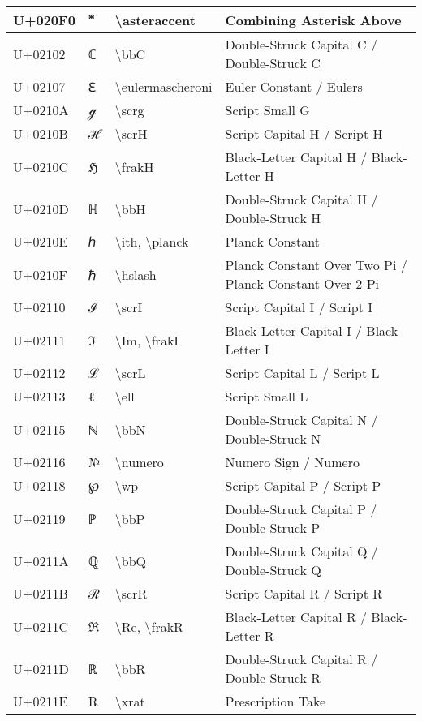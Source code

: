 \begin{table}[h]
\begin{tabulary}{\linewidth}{|L|L|L|L|}
\hline
U+020F0 &  ⃰  & {\textbackslash}asteraccent & Combining Asterisk Above \\
\hline
U+02102 & ℂ & {\textbackslash}bbC & Double-Struck Capital C / Double-Struck C \\
\hline
U+02107 & ℇ & {\textbackslash}eulermascheroni & Euler Constant / Eulers \\
\hline
U+0210A & ℊ & {\textbackslash}scrg & Script Small G \\
\hline
U+0210B & ℋ & {\textbackslash}scrH & Script Capital H / Script H \\
\hline
U+0210C & ℌ & {\textbackslash}frakH & Black-Letter Capital H / Black-Letter H \\
\hline
U+0210D & ℍ & {\textbackslash}bbH & Double-Struck Capital H / Double-Struck H \\
\hline
U+0210E & ℎ & {\textbackslash}ith, {\textbackslash}planck & Planck Constant \\
\hline
U+0210F & ℏ & {\textbackslash}hslash & Planck Constant Over Two Pi / Planck Constant Over 2 Pi \\
\hline
U+02110 & ℐ & {\textbackslash}scrI & Script Capital I / Script I \\
\hline
U+02111 & ℑ & {\textbackslash}Im, {\textbackslash}frakI & Black-Letter Capital I / Black-Letter I \\
\hline
U+02112 & ℒ & {\textbackslash}scrL & Script Capital L / Script L \\
\hline
U+02113 & ℓ & {\textbackslash}ell & Script Small L \\
\hline
U+02115 & ℕ & {\textbackslash}bbN & Double-Struck Capital N / Double-Struck N \\
\hline
U+02116 & № & {\textbackslash}numero & Numero Sign / Numero \\
\hline
U+02118 & ℘ & {\textbackslash}wp & Script Capital P / Script P \\
\hline
U+02119 & ℙ & {\textbackslash}bbP & Double-Struck Capital P / Double-Struck P \\
\hline
U+0211A & ℚ & {\textbackslash}bbQ & Double-Struck Capital Q / Double-Struck Q \\
\hline
U+0211B & ℛ & {\textbackslash}scrR & Script Capital R / Script R \\
\hline
U+0211C & ℜ & {\textbackslash}Re, {\textbackslash}frakR & Black-Letter Capital R / Black-Letter R \\
\hline
U+0211D & ℝ & {\textbackslash}bbR & Double-Struck Capital R / Double-Struck R \\
\hline
U+0211E & ℞ & {\textbackslash}xrat & Prescription Take \\

\end{tabulary}
\end{table}
